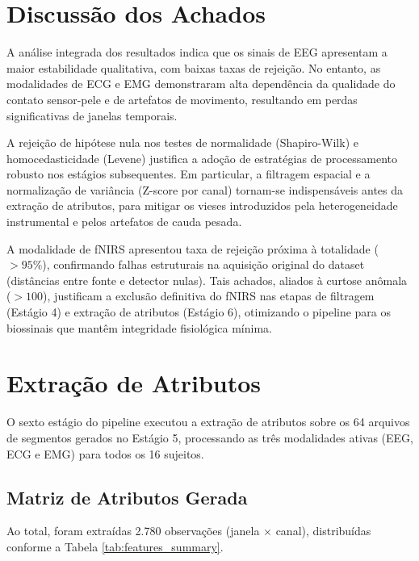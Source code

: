 \section{Discussão dos Achados}

A análise integrada dos resultados indica que os sinais de EEG apresentam a maior estabilidade qualitativa, com baixas taxas de rejeição. No entanto, as modalidades de ECG e EMG demonstraram alta dependência da qualidade do contato sensor-pele e de artefatos de movimento, resultando em perdas significativas de janelas temporais. 

A rejeição de hipótese nula nos testes de normalidade (Shapiro-Wilk) e homocedasticidade (Levene) justifica a adoção de estratégias de processamento robusto nos estágios subsequentes. Em particular, a filtragem espacial e a normalização de variância (Z-score por canal) tornam-se indispensáveis antes da extração de atributos, para mitigar os vieses introduzidos pela heterogeneidade instrumental e pelos artefatos de cauda pesada.

A modalidade de fNIRS apresentou taxa de rejeição próxima à totalidade ($>95\%$), confirmando falhas estruturais na aquisição original do dataset (distâncias entre fonte e detector nulas). Tais achados, aliados à curtose anômala ($>100$), justificam a exclusão definitiva do fNIRS nas etapas de filtragem (Estágio 4) e extração de atributos (Estágio 6), otimizando o pipeline para os biossinais que mantêm integridade fisiológica mínima.

\section{Extração de Atributos}
\label{sec:resultados_extracao}

O sexto estágio do pipeline executou a extração de atributos sobre os 64 arquivos de segmentos gerados no Estágio 5, processando as três modalidades ativas (EEG, ECG e EMG) para todos os 16 sujeitos.

\subsection{Matriz de Atributos Gerada}

Ao total, foram extraídas 2.780 observações (janela $\times$ canal), distribuídas conforme a Tabela \ref{tab:features_summary}.

